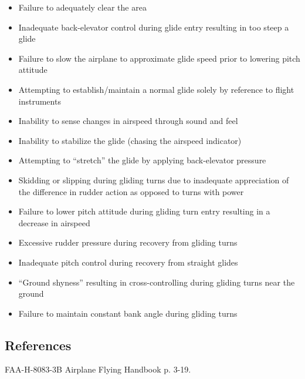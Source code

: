 \begin{itemize}
  \item Failure to adequately clear the area
  \item Inadequate back-elevator control during glide entry resulting in too
    steep a glide
  \item Failure to slow the airplane to approximate glide speed prior to
    lowering pitch attitude
  \item Attempting to establish/maintain a normal glide solely by reference to
    flight instruments
  \item Inability to sense changes in airspeed through sound and feel
  \item Inability to stabilize the glide (chasing the airspeed indicator)
  \item Attempting to ``stretch'' the glide by applying back-elevator pressure
  \item Skidding or slipping during gliding turns due to inadequate
    appreciation of the difference in rudder action as opposed to turns with
    power
  \item Failure to lower pitch attitude during gliding turn entry resulting in
    a decrease in airspeed
  \item Excessive rudder pressure during recovery from gliding turns
  \item Inadequate pitch control during recovery from straight glides
  \item ``Ground shyness'' resulting in cross-controlling during gliding turns
    near the ground
  \item Failure to maintain constant bank angle during gliding turns
\end{itemize}

\subsection{References}

FAA-H-8083-3B Airplane Flying Handbook p. 3-19.

